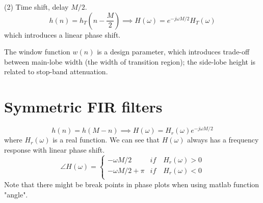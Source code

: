 (2) Time shift, delay $M/2$.
\begin{equation}
  \label{eq:firdelay}
  h(n)=h_T(n-\frac{M}{2}) \implies H(\omega) = e^{-j\omega M/2} H_T(\omega)
\end{equation}
which introduces a linear phase shift. 

The window function $w(n)$ is a design parameter, which introduces trade-off between main-lobe width
(the width of transition region); the side-lobe height is related to stop-band attenuation. 

\begin{table}[H]
\begin{center}
\caption{Properties of several window functions}
\label{winproperty}
\end{center}
\end{table} 

\section*{Symmetric FIR filters}
\begin{equation}
  \label{eq:symm}
  h(n) = h(M-n) \implies H(\omega) = H_r(\omega)e^{-j\omega M/2}
\end{equation}
where $H_r(\omega)$ is a real function. We can see that $H(\omega)$ always has 
a frequency response with linear phase shift. 
\begin{equation}
  \label{eq:linearphase}
  \angle{H(\omega)}= \left\{
    \begin{array}{cc}
      -\omega M/2 & if \quad H_r(\omega) > 0 \\
      -\omega M/2 + \pi & if \quad H_r(\omega) < 0 \\
    \end{array}
    \right.
\end{equation}
Note that there might be break points in phase plots when using matlab function "angle".